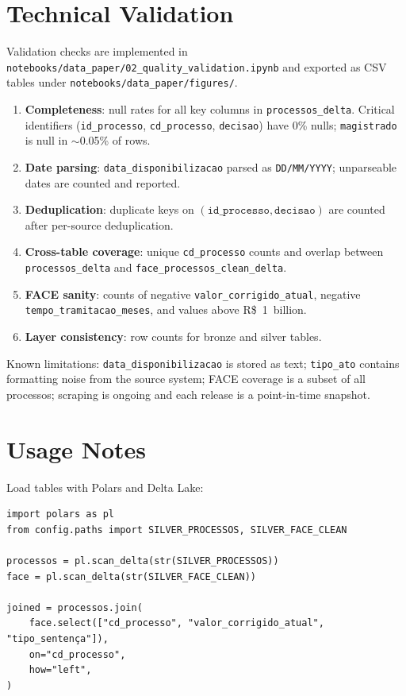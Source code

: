 \documentclass[11pt,a4paper]{article}
\begin{document}
\section*{Technical Validation}

Validation checks are implemented in \texttt{notebooks/data\_paper/02\_quality\_validation.ipynb} and exported as CSV tables under \texttt{notebooks/data\_paper/figures/}.

\begin{enumerate}
  \item \textbf{Completeness}: null rates for all key columns in \texttt{processos\_delta}. Critical identifiers (\texttt{id\_processo}, \texttt{cd\_processo}, \texttt{decisao}) have 0\% nulls; \texttt{magistrado} is null in ${\sim}$0.05\% of rows.
  \item \textbf{Date parsing}: \texttt{data\_disponibilizacao} parsed as \texttt{DD/MM/YYYY}; unparseable dates are counted and reported.
  \item \textbf{Deduplication}: duplicate keys on \((\texttt{id\_processo}, \texttt{decisao})\) are counted after per-source deduplication.
  \item \textbf{Cross-table coverage}: unique \texttt{cd\_processo} counts and overlap between \texttt{processos\_delta} and \texttt{face\_processos\_clean\_delta}.
  \item \textbf{FACE sanity}: counts of negative \texttt{valor\_corrigido\_atual}, negative \texttt{tempo\_tramitacao\_meses}, and values above R\$~1~billion.
  \item \textbf{Layer consistency}: row counts for bronze and silver tables.
\end{enumerate}

Known limitations: \texttt{data\_disponibilizacao} is stored as text; \texttt{tipo\_ato} contains formatting noise from the source system; FACE coverage is a subset of all processos; scraping is ongoing and each release is a point-in-time snapshot.

\section*{Usage Notes}

Load tables with Polars and Delta Lake:

\begin{verbatim}
import polars as pl
from config.paths import SILVER_PROCESSOS, SILVER_FACE_CLEAN

processos = pl.scan_delta(str(SILVER_PROCESSOS))
face = pl.scan_delta(str(SILVER_FACE_CLEAN))

joined = processos.join(
    face.select(["cd_processo", "valor_corrigido_atual", "tipo_sentença"]),
    on="cd_processo",
    how="left",
)
\end{verbatim}
\end{document}
